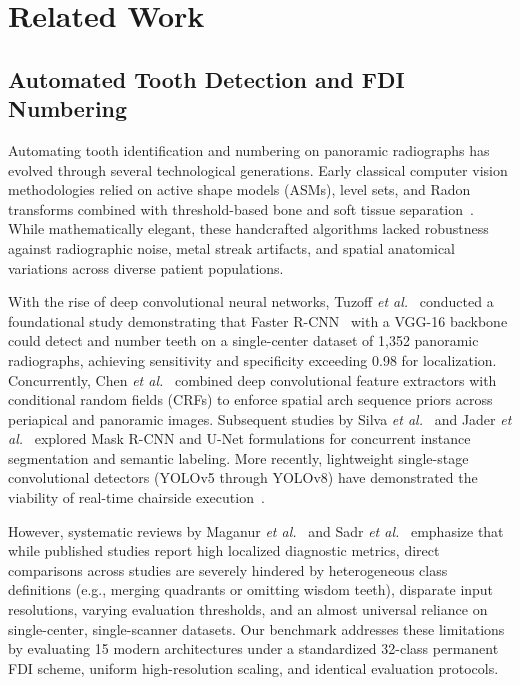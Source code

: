 \documentclass[10pt,journal,compsoc]{IEEEtran}
\begin{document}
\section{Related Work}
\label{sec:related_work}

\subsection{Automated Tooth Detection and FDI Numbering}
Automating tooth identification and numbering on panoramic radiographs has evolved through several technological generations. Early classical computer vision methodologies relied on active shape models (ASMs), level sets, and Radon transforms combined with threshold-based bone and soft tissue separation~\cite{chen2019}. While mathematically elegant, these handcrafted algorithms lacked robustness against radiographic noise, metal streak artifacts, and spatial anatomical variations across diverse patient populations.

With the rise of deep convolutional neural networks, Tuzoff \textit{et al.}~\cite{tuzoff2019} conducted a foundational study demonstrating that Faster R-CNN~\cite{ren2015faster} with a VGG-16 backbone could detect and number teeth on a single-center dataset of 1,352 panoramic radiographs, achieving sensitivity and specificity exceeding 0.98 for localization. Concurrently, Chen \textit{et al.}~\cite{chen2019} combined deep convolutional feature extractors with conditional random fields (CRFs) to enforce spatial arch sequence priors across periapical and panoramic images. Subsequent studies by Silva \textit{et al.}~\cite{silva2020} and Jader \textit{et al.}~\cite{jader2018} explored Mask R-CNN and U-Net formulations for concurrent instance segmentation and semantic labeling. More recently, lightweight single-stage convolutional detectors (YOLOv5 through YOLOv8) have demonstrated the viability of real-time chairside execution~\cite{maganur2024,sadr2024}. 

However, systematic reviews by Maganur \textit{et al.}~\cite{maganur2024} and Sadr \textit{et al.}~\cite{sadr2024} emphasize that while published studies report high localized diagnostic metrics, direct comparisons across studies are severely hindered by heterogeneous class definitions (e.g., merging quadrants or omitting wisdom teeth), disparate input resolutions, varying evaluation thresholds, and an almost universal reliance on single-center, single-scanner datasets. Our benchmark addresses these limitations by evaluating 15 modern architectures under a standardized 32-class permanent FDI scheme, uniform high-resolution scaling, and identical evaluation protocols.
\end{document}
